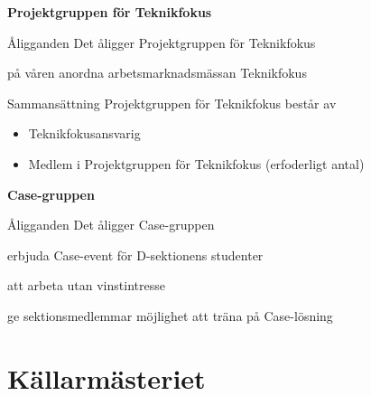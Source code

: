 \documentclass[pdfbookmarks,a4paper,11pt]{article}
\newlength{\itemcollength}
\newenvironment{reglemlista}{%
  \begin{list}{}{%
      \setlength{\labelwidth}{\itemcollength}%
      \setlength{\leftmargin}{\labelwidth + \labelsep}%
      \renewcommand{\makelabel}[1]{%
        \raisebox{0pt}[1ex][0pt]{%
          \makebox[\labelwidth][l]{%
            \parbox[t]{\itemcollength}{%
              \raggedright\hspace{0pt}##1}}}\hfill}%
      }}{%
  \end{list}}
\begin{document}
\textbf{Projektgruppen för Teknikfokus}
\begin{reglemlista}
	\item[Åligganden]
	Det åligger Projektgruppen för Teknikfokus

	\begin{attlista}
		\item på våren anordna arbetsmarknadsmässan Teknikfokus
	\end{attlista}

	\item[Sammansättning]
	Projektgruppen för Teknikfokus består av
	\begin{itemize}
		\item Teknikfokusansvarig
		\item Medlem i Projektgruppen för Teknikfokus (erfoderligt antal)
	\end{itemize}
	
\end{reglemlista}

\textbf{Case-gruppen}
\begin{reglemlista}
	\item[Åligganden]
    Det åligger Case-gruppen
    \begin{attlista}
    	\item erbjuda Case-event för D-sektionens studenter
        \item att arbeta utan vinstintresse
        \item ge sektionsmedlemmar möjlighet att träna på Case-lösning
    \end{attlista}
    
\end{reglemlista}

\section{Källarmästeriet}
\end{document}
